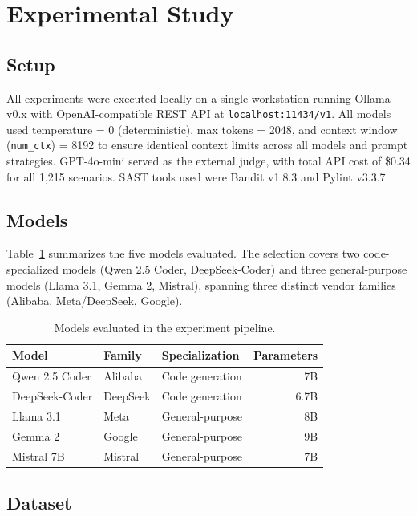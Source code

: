 \documentclass[runningheads]{llncs}
\begin{document}
\section{Experimental Study}
\label{sec:experiments}

\subsection{Setup}

All experiments were executed locally on a single workstation running Ollama v0.x with OpenAI-compatible REST API at \texttt{localhost:11434/v1}. All models used temperature = 0 (deterministic), max tokens = 2048, and context window (\texttt{num\_ctx}) = 8192 to ensure identical context limits across all models and prompt strategies. GPT-4o-mini served as the external judge, with total API cost of \$0.34 for all 1,215 scenarios. SAST tools used were Bandit v1.8.3 and Pylint v3.3.7.

\subsection{Models}

Table~\ref{tab:models} summarizes the five models evaluated. The selection covers two code-specialized models (Qwen 2.5 Coder, DeepSeek-Coder) and three general-purpose models (Llama 3.1, Gemma 2, Mistral), spanning three distinct vendor families (Alibaba, Meta/DeepSeek, Google).

\begin{table}[H]
\centering
\caption{Models evaluated in the experiment pipeline.}
\label{tab:models}
\begin{tabular}{lllr}
\toprule
\textbf{Model} & \textbf{Family} & \textbf{Specialization} & \textbf{Parameters} \\
\midrule
Qwen 2.5 Coder  & Alibaba  & Code generation  & 7B   \\
DeepSeek-Coder  & DeepSeek & Code generation  & 6.7B \\
Llama 3.1       & Meta     & General-purpose  & 8B   \\
Gemma 2         & Google   & General-purpose  & 9B   \\
Mistral 7B      & Mistral  & General-purpose  & 7B   \\
\bottomrule
\end{tabular}
\end{table}

\subsection{Dataset}
\end{document}
